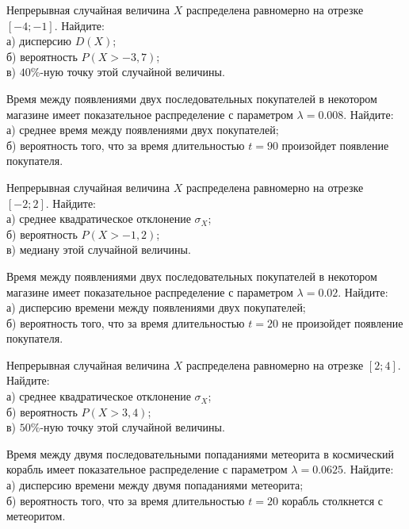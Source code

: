 \vfill

\newpage\setcounter{zad}{0}

\z Непрерывная случайная величина $X$ распределена равномерно на отрезке $[-4; -1]$. Найдите: \\ \quad а) дисперсию $D(X)$; \\ \quad б) вероятность $P(X>-3{,}7)$; \\ \quad в) $40\%$-ную точку этой случайной величины.


\vfill

\z Время между появлениями двух последовательных покупателей в некотором магазине имеет показательное распределение с параметром $\lambda = 0.008$. Найдите: \\ \quad а) среднее время между появлениями двух покупателей; \\ \quad б) вероятность того, что за время длительностью $t = 90$  произойдет появление покупателя.
 

\vfill

\newpage\setcounter{zad}{0}

\z Непрерывная случайная величина $X$ распределена равномерно на отрезке $[-2; 2]$. Найдите: \\ \quad а) среднее квадратическое отклонение $\sigma_X$; \\ \quad б) вероятность $P(X>-1{,}2)$; \\ \quad в) медиану этой случайной величины.


\vfill

\z Время между появлениями двух последовательных покупателей в некотором магазине имеет показательное распределение с параметром $\lambda = 0.02$. Найдите: \\ \quad а) дисперсию времени между появлениями двух покупателей; \\ \quad б) вероятность того, что за время длительностью $t = 20$ не произойдет появление покупателя.
 

\vfill

\newpage\setcounter{zad}{0}

\z Непрерывная случайная величина $X$ распределена равномерно на отрезке $[2; 4]$. Найдите: \\ \quad а) среднее квадратическое отклонение $\sigma_X$; \\ \quad б) вероятность $P(X>3{,}4)$; \\ \quad в) $50\%$-ную точку этой случайной величины.


\vfill

\z Время между двумя последовательными попаданиями метеорита в космический корабль имеет показательное распределение с параметром $\lambda = 0.0625$. Найдите: \\ \quad а) дисперсию времени между двумя попаданиями метеорита; \\ \quad б) вероятность того, что за время длительностью $t = 20$ корабль  столкнется с метеоритом.
 

